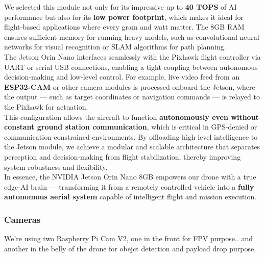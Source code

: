 \documentclass[12pt]{report}
\begin{document}
     
       We selected this module not only for its impressive up to \textbf{40 TOPS} of AI performance but also for its \textbf{low power footprint}, which makes it ideal for flight-based applications where every gram and watt matter. The 8GB RAM ensures sufficient memory for running heavy models, such as convolutional neural networks for visual recognition or SLAM algorithms for path planning. \\


      The Jetson Orin Nano interfaces seamlessly with the Pixhawk flight controller via UART or serial USB connections, enabling a tight coupling between autonomous decision-making and low-level control. For example, live video feed from an \textbf{ESP32-CAM} or other camera modules is processed onboard the Jetson, where the output — such as target coordinates or navigation commands — is relayed to the Pixhawk for actuation. \\

      This configuration allows the aircraft to function \textbf{autonomously even without constant ground station communication}, which is critical in GPS-denied or communication-constrained environments. By offloading high-level intelligence to the Jetson module, we achieve a modular and scalable architecture that separates perception and decision-making from flight stabilization, thereby improving system robustness and flexibility. \\

      In essence, the NVIDIA Jetson Orin Nano 8GB empowers our drone with a true edge-AI brain — transforming it from a remotely controlled vehicle into a \textbf{fully autonomous aerial system} capable of intelligent flight and mission execution.

      \subsubsection{\large Cameras}
      We're using two Raspberry Pi Cam V2, one in the front for FPV purpose.. and another in the belly of the drone for obejct detection and payload drop purpose.
\end{document}
